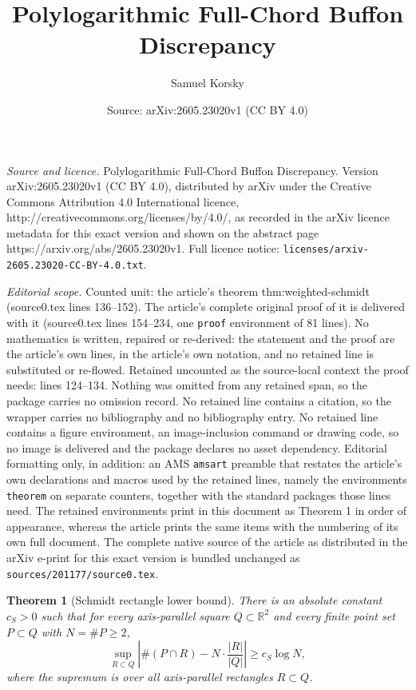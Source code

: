 \documentclass[10pt,a4paper]{amsart}
\title{Polylogarithmic Full-Chord Buffon Discrepancy}
\author{Samuel Korsky}
\date{Source: arXiv:2605.23020v1 (CC BY 4.0)}
\newtheorem{theorem}{Theorem}
\newcommand{\R}{\mathbb R}
\begin{document}
\maketitle

\noindent\emph{Source and licence.} Polylogarithmic Full-Chord Buffon Discrepancy. Version arXiv:2605.23020v1 (CC BY 4.0), distributed by arXiv under the Creative Commons Attribution 4.0 International licence, http://creativecommons.org/licenses/by/4.0/, as recorded in the arXiv licence metadata for this exact version and shown on the abstract page https://arxiv.org/abs/2605.23020v1. Full licence notice: \texttt{licenses/arxiv-2605.23020-CC-BY-4.0.txt}.\par\smallskip

\noindent\textit{Editorial scope.} Counted unit: the article's theorem thm:weighted-schmidt (source0.tex lines 136--152). The article's complete original proof of it is delivered with it (source0.tex lines 154--234, one \texttt{proof} environment of 81 lines). No mathematics is written, repaired or re-derived: the statement and the proof are the article's own lines, in the article's own notation, and no retained line is substituted or re-flowed.  Retained uncounted as the source-local context the proof needs: lines 124--134.  Nothing was omitted from any retained span, so the package carries no omission record.  No retained line contains a citation, so the wrapper carries no bibliography and no bibliography entry.  No retained line contains a figure environment, an image-inclusion command or drawing code, so no image is delivered and the package declares no asset dependency.  Editorial formatting only, in addition: an AMS \texttt{amsart} preamble that restates the article's own declarations and macros used by the retained lines, namely the environments \texttt{theorem} on separate counters, together with the standard packages those lines need.  The retained environments print in this document as Theorem 1 in order of appearance, whereas the article prints the same items with the numbering of its own full document.  The complete native source of the article as distributed in the arXiv e-print for this exact version is bundled unchanged as \texttt{sources/201177/source0.tex}.
\begin{theorem}[Schmidt rectangle lower bound]\label{thm:schmidt-rect}
There is an absolute constant $c_S>0$ such that for every axis-parallel square $Q\subset\R^2$ and every finite point set $P\subset Q$ with $N=\#P\ge2$,
\[
        \sup_{R\subset Q}
        \left|
        \#(P\cap R)-N\cdot\frac{|R|}{|Q|}
        \right|
        \ge c_S\log N,
\]
where the supremum is over all axis-parallel rectangles $R\subset Q$.
\end{theorem}
\end{document}
